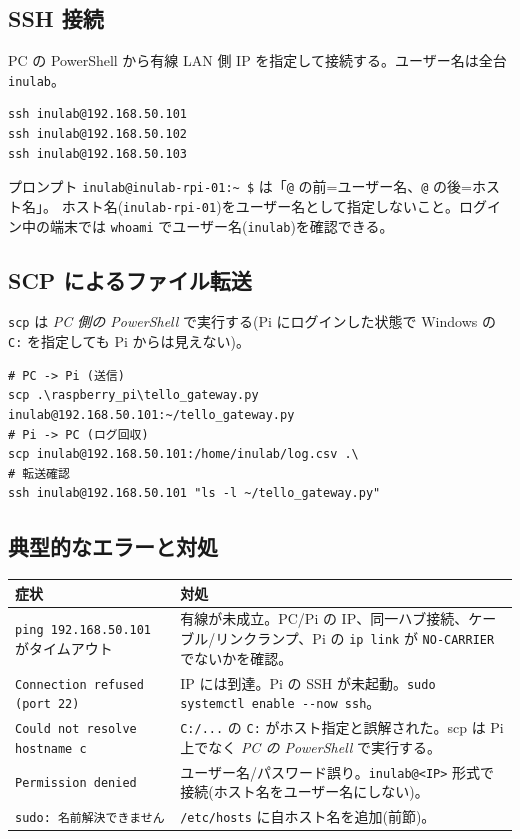 \documentclass[11pt,a4paper]{ltjsarticle}
\newcommand{\code}[1]{\texttt{\small #1}}
\begin{document}
\subsection{SSH 接続}
PC の PowerShell から有線 LAN 側 IP を指定して接続する。ユーザー名は全台 \code{inulab}。
\begin{lstlisting}
ssh inulab@192.168.50.101
ssh inulab@192.168.50.102
ssh inulab@192.168.50.103
\end{lstlisting}
プロンプト \code{inulab@inulab-rpi-01:\textasciitilde{} \$} は「\code{@} の前=ユーザー名、\code{@} の後=ホスト名」。
ホスト名(\code{inulab-rpi-01})をユーザー名として指定しないこと。ログイン中の端末では
\code{whoami} でユーザー名(\code{inulab})を確認できる。

\subsection{SCP によるファイル転送}
\code{scp} は \emph{PC 側の PowerShell} で実行する(Pi にログインした状態で Windows の
\code{C:} を指定しても Pi からは見えない)。
\begin{lstlisting}
# PC -> Pi (送信)
scp .\raspberry_pi\tello_gateway.py inulab@192.168.50.101:~/tello_gateway.py
# Pi -> PC (ログ回収)
scp inulab@192.168.50.101:/home/inulab/log.csv .\
# 転送確認
ssh inulab@192.168.50.101 "ls -l ~/tello_gateway.py"
\end{lstlisting}

\subsection{典型的なエラーと対処}
\begin{longtable}{@{}p{5.2cm}p{9.4cm}@{}}
\toprule
\textbf{症状} & \textbf{対処} \\
\midrule
\endhead
\code{ping 192.168.50.101} がタイムアウト & 有線が未成立。PC/Pi の IP、同一ハブ接続、ケーブル/リンクランプ、Pi の \code{ip link} が \code{NO-CARRIER} でないかを確認。\\
\code{Connection refused (port 22)} & IP には到達。Pi の SSH が未起動。\code{sudo systemctl enable -{}-now ssh}。\\
\code{Could not resolve hostname c} & \code{C:/...} の \code{C:} がホスト指定と誤解された。scp は Pi 上でなく \emph{PC の PowerShell} で実行する。\\
\code{Permission denied} & ユーザー名/パスワード誤り。\code{inulab@<IP>} 形式で接続(ホスト名をユーザー名にしない)。\\
\code{sudo: 名前解決できません} & \code{/etc/hosts} に自ホスト名を追加(前節)。\\
\bottomrule
\end{longtable}
\end{document}
